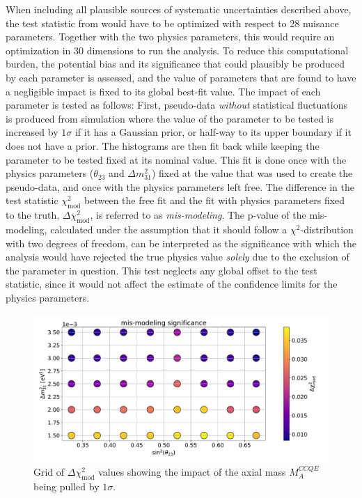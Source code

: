 When including all plausible sources of systematic uncertainties described above, the test statistic from  would have to be optimized with respect to 28 nuisance parameters. Together with the two physics parameters, this would require an optimization in 30 dimensions to run the analysis. To reduce this computational burden, the potential bias and its significance that could plausibly be produced by each parameter is assessed, and the value of parameters that are found to have a negligible impact is fixed to its global best-fit value. The impact of each parameter is tested as follows: First, pseudo-data \emph{without} statistical fluctuations is produced from simulation where the value of the parameter to be tested is increased by $1\sigma$ if it has a Gaussian prior, or half-way to its upper boundary if it does not have a prior. The histograms are then fit back while keeping the parameter to be tested fixed at its nominal value. This fit is done once with the physics parameters ($\theta_{23}$ and $\Delta m^2_{31}$) fixed at the value that was used to create the pseudo-data, and once with the physics parameters left free. The difference in the test statistic $\chi^2_{\mathrm{mod}}$ between the free fit and the fit with physics parameters fixed to the truth, $\Delta \chi^2_{\mathrm{mod}}$, is referred to as \emph{mis-modeling}. The p-value of the mis-modeling, calculated under the assumption that it should follow a $\chi^2$-distribution with two degrees of freedom, can be interpreted as the significance with which the analysis would have rejected the true physics value \emph{solely} due to the exclusion of the parameter in question. This test neglects any global offset to the test statistic, since it would not affect the estimate of the confidence limits for the physics parameters.
\begin{figure}
    \centering
    \includegraphics[width=\linewidth]{figures/measurement/three_flavor/asimov_test/systematic_impact_test-asimov_test-000015_GENIE_MA_QE.pdf}
    \caption{Grid of $\Delta \chi^2_{\mathrm{mod}}$ values showing the impact of the axial mass $M_A^{CCQE}$ being pulled by $1\sigma$.}
    \label{fig:systematic-impact-mismod-example}
\end{figure}
